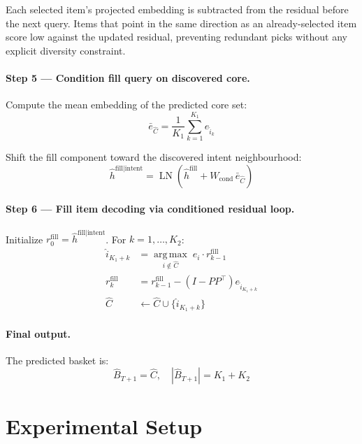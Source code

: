 \documentclass[conference]{IEEEtran}
\begin{document}
Each selected item's projected embedding is subtracted from the
residual before the next query. Items that point in the same direction
as an already-selected item score low against the updated residual,
preventing redundant picks without any explicit diversity constraint.

\paragraph{Step 5 --- Condition fill query on discovered core.}
Compute the mean embedding of the predicted core set:
\begin{equation}
\bar{e}_{\hat{C}} = \frac{1}{K_1} \sum_{k=1}^{K_1} e_{\hat{i}_k}
\end{equation}

Shift the fill component toward the discovered intent neighbourhood:
\begin{equation}
\hat{h}^{\text{fill} \mid \text{intent}}
  = \operatorname{LN}\!\left(\hat{h}^{\text{fill}}
    + W_{\text{cond}}\,\bar{e}_{\hat{C}}\right)
\end{equation}

\paragraph{Step 6 --- Fill item decoding via conditioned residual loop.}
Initialize $r_0^{\text{fill}} = \hat{h}^{\text{fill} \mid \text{intent}}$.
For $k = 1, \ldots, K_2$:
\begin{align}
\hat{i}_{K_1+k} &= \operatorname*{arg\,max}_{i \notin \hat{C}}\;
                   e_i \cdot r_{k-1}^{\text{fill}} \\
r_k^{\text{fill}} &= r_{k-1}^{\text{fill}}
                   - (I - PP^\top) e_{\hat{i}_{K_1+k}} \\
\hat{C} &\leftarrow \hat{C} \cup \{\hat{i}_{K_1+k}\}
\end{align}

\paragraph{Final output.}
The predicted basket is:
\begin{equation}
\hat{B}_{T+1} = \hat{C}, \quad |\hat{B}_{T+1}| = K_1 + K_2
\end{equation}


\section{Experimental Setup}
\label{sec:experiments}
\end{document}
